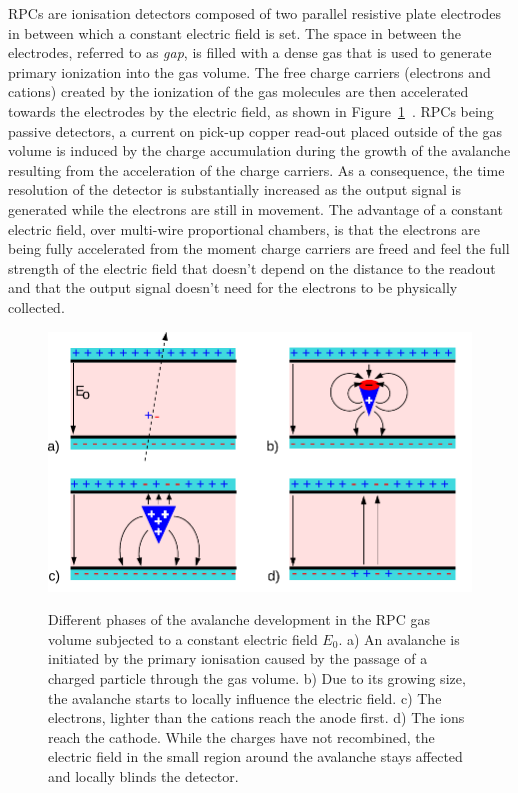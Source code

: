 	RPCs are ionisation detectors composed of two parallel resistive plate electrodes in between which a constant electric field is set. The space in between the electrodes, referred to as \textit{gap}, is filled with a dense gas that is used to generate primary ionization into the gas volume. The free charge carriers (electrons and cations) created by the ionization of the gas molecules are then accelerated towards the electrodes by the electric field, as shown in Figure~\ref{fig:RPC_principle}~\cite{LIPPMANN2003}. RPCs being passive detectors, a current on pick-up copper read-out placed outside of the gas volume is induced by the charge accumulation during the growth of the avalanche resulting from the acceleration of the charge carriers. As a consequence, the time resolution of the detector is substantially increased as the output signal is generated while the electrons are still in movement. The advantage of a constant electric field, over multi-wire proportional chambers, is that the electrons are being fully accelerated from the moment charge carriers are freed and feel the full strength of the electric field that doesn't depend on the distance to the readout and that the output signal doesn't need for the electrons to be physically collected.
	
	\begin{figure}[H]
		\centering
		\includegraphics[width = \plotwidth]{fig/chapt4/RPC_principle.pdf}\\
		\caption{\label{fig:RPC_principle} Different phases of the avalanche development in the RPC gas volume subjected to a constant electric field $E_0$. a) An avalanche is initiated by the primary ionisation caused by the passage of a charged particle through the gas volume. b) Due to its growing size, the avalanche starts to locally influence the electric field. c) The electrons, lighter than the cations reach the anode first. d) The ions reach the cathode. While the charges have not recombined, the electric field in the small region around the avalanche stays affected and locally blinds the detector.}
	\end{figure}
	
